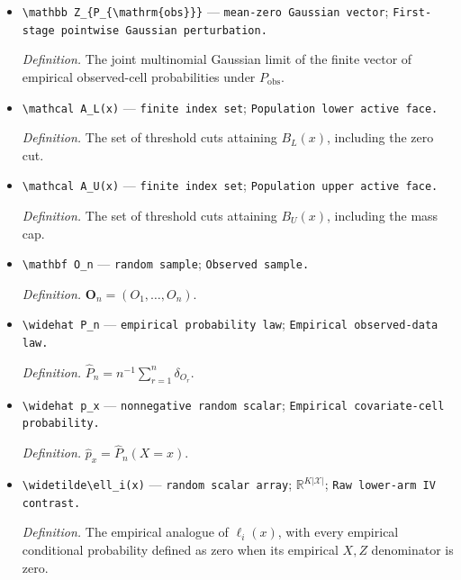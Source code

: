 \documentclass{article}
\begin{document}
\begin{itemize}
  \par\smallskip\noindent\emph{Definition.} \(\mathcal X_+(P)=\{x\in\mathcal X:p_xm(x)>0\}\).
  \item \texttt{\textbackslash{}\allowbreak{}mathbb Z\_\allowbreak{}\{P\_\allowbreak{}\{\textbackslash{}\allowbreak{}mathrm\{obs\}\allowbreak{}\}\allowbreak{}\}\allowbreak{}} --- \texttt{mean-\allowbreak{}zero Gaussian vector}; \texttt{First-\allowbreak{}stage pointwise Gaussian perturbation.}
  \par\smallskip\noindent\emph{Definition.} The joint multinomial Gaussian limit of the finite vector of empirical observed-cell probabilities under \(P_{\mathrm{obs}}\).
  \item \texttt{\textbackslash{}\allowbreak{}mathcal A\_\allowbreak{}L(x)} --- \texttt{finite index set}; \texttt{Population lower active face.}
  \par\smallskip\noindent\emph{Definition.} The set of threshold cuts attaining \(B_L(x)\), including the zero cut.
  \item \texttt{\textbackslash{}\allowbreak{}mathcal A\_\allowbreak{}U(x)} --- \texttt{finite index set}; \texttt{Population upper active face.}
  \par\smallskip\noindent\emph{Definition.} The set of threshold cuts attaining \(B_U(x)\), including the mass cap.
  \item \texttt{\textbackslash{}\allowbreak{}mathbf O\_\allowbreak{}n} --- \texttt{random sample}; \texttt{Observed sample.}
  \par\smallskip\noindent\emph{Definition.} \(\mathbf O_n=(O_1,\ldots,O_n)\).
  \item \texttt{\textbackslash{}\allowbreak{}widehat P\_\allowbreak{}n} --- \texttt{empirical probability law}; \texttt{Empirical observed-\allowbreak{}data law.}
  \par\smallskip\noindent\emph{Definition.} \(\widehat P_n=n^{-1}\sum_{r=1}^n\delta_{O_r}\).
  \item \texttt{\textbackslash{}\allowbreak{}widehat p\_\allowbreak{}x} --- \texttt{nonnegative random scalar}; \texttt{Empirical covariate-\allowbreak{}cell probability.}
  \par\smallskip\noindent\emph{Definition.} \(\widehat p_x=\widehat P_n(X=x)\).
  \item \texttt{\textbackslash{}\allowbreak{}widetilde\textbackslash{}\allowbreak{}ell\_\allowbreak{}i(x)} --- \texttt{random scalar array}; \(\mathbb R^{K|\mathcal X|}\); \texttt{Raw lower-\allowbreak{}arm IV contrast.}
  \par\smallskip\noindent\emph{Definition.} The empirical analogue of \(\ell_i(x)\), with every empirical conditional probability defined as zero when its empirical \(X,Z\) denominator is zero.

\end{itemize}
\end{document}
